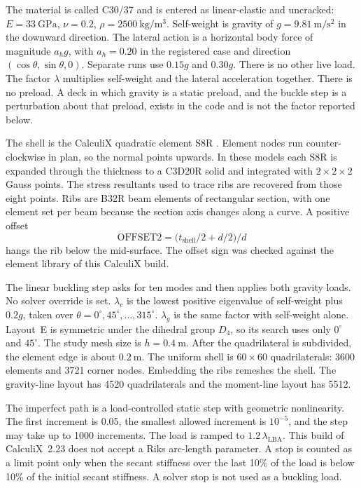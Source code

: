 \documentclass[11pt,a4paper]{article}
\begin{document}
The material is called C30/37 and is entered as linear-elastic and uncracked: \(E = 33~\mathrm{GPa}\), \(\nu = 0.2\), \(\rho = 2500~\mathrm{kg/m^{3}}\).
Self-weight is gravity of \(g = 9.81~\mathrm{m/s^{2}}\) in the downward direction.
The lateral action is a horizontal body force of magnitude \(a_h g\), with \(a_h = 0.20\) in the registered case and direction \((\cos\theta,\sin\theta,0)\).
Separate runs use \(0.15g\) and \(0.30g\).
There is no other live load.
The factor \(\lambda\) multiplies self-weight and the lateral acceleration together.
There is no preload.
A deck in which gravity is a static preload, and the buckle step is a perturbation about that preload, exists in the code and is not the factor reported below.

The shell is the CalculiX quadratic element S8R \citep{dhondt2025}.
Element nodes run counter-clockwise in plan, so the normal points upwards.
In these models each S8R is expanded through the thickness to a C3D20R solid and integrated with \(2\times 2\times 2\) Gauss points.
The stress resultants used to trace ribs are recovered from those eight points.
Ribs are B32R beam elements of rectangular section, with one element set per beam because the section axis changes along a curve.
A positive offset
\begin{equation}
\mathrm{OFFSET2} = \bigl(t_{\mathrm{shell}}/2 + d/2\bigr)/d
\label{eq:offset}
\end{equation}
hangs the rib below the mid-surface.
The offset sign was checked against the element library of this CalculiX build.

The linear buckling step asks for ten modes and then applies both gravity loads.
No solver override is set.
\(\lambda_c\) is the lowest positive eigenvalue of self-weight plus \(0.2g\), taken over \(\theta = 0^{\circ},45^{\circ},\ldots,315^{\circ}\).
\(\lambda_g\) is the same factor with self-weight alone.
Layout~E is symmetric under the dihedral group \(D_4\), so its search uses only \(0^{\circ}\) and \(45^{\circ}\).
The study mesh size is \(h = 0.4~\mathrm{m}\).
After the quadrilateral is subdivided, the element edge is about \(0.2~\mathrm{m}\).
The uniform shell is \(60\times 60\) quadrilaterals: 3600 elements and 3721 corner nodes.
Embedding the ribs remeshes the shell.
The gravity-line layout has 4520 quadrilaterals and the moment-line layout has 5512.

The imperfect path is a load-controlled static step with geometric nonlinearity.
The first increment is 0.05, the smallest allowed increment is \(10^{-5}\), and the step may take up to 1000 increments.
The load is ramped to \(1.2\,\lambda_{\mathrm{LBA}}\).
This build of CalculiX~2.23 does not accept a Riks arc-length parameter.
A stop is counted as a limit point only when the secant stiffness over the last 10\% of the load is below 10\% of the initial secant stiffness.
A solver stop is not used as a buckling load.
\end{document}

